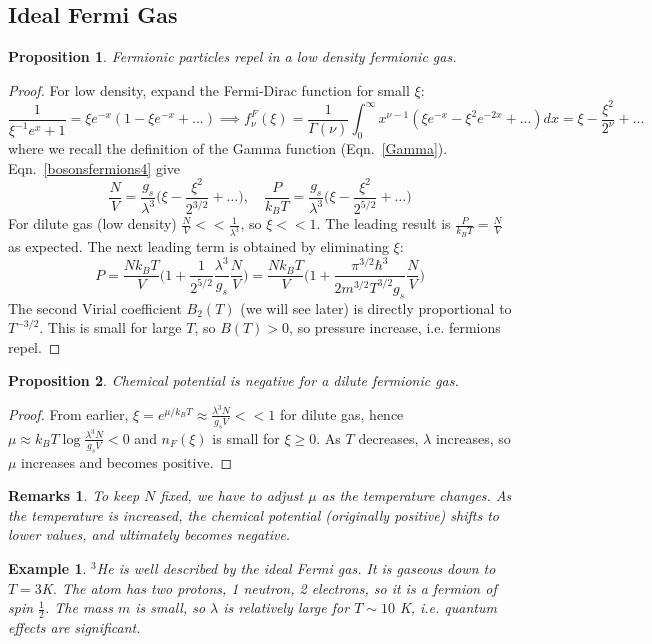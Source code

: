 \documentclass[a4paper]{article}
\newtheorem{eg}{Example}[section]
\newtheorem{remarks}{Remarks}[section]
\theoremstyle{new}
\newtheorem{prop}{Proposition}[section]
\begin{document}
\subsection{Ideal Fermi Gas}
\begin{prop}
Fermionic particles repel in a low density fermionic gas.
\end{prop}
\begin{proof}
For low density, expand the Fermi-Dirac function for small $\xi$:
$$\frac{1}{\xi^{-1}e^x+1}=\xi e^{-x}(1-\xi e^{-x}+...)\implies f_\nu^F(\xi)=\frac{1}{\Gamma(\nu)}\int_0^\infty x^{\nu-1}(\xi e^{-x}-\xi^2e^{-2x}+...)dx=\xi-\frac{\xi^2}{2^\nu}+...$$
where we recall the definition of the Gamma function (Eqn.~\ref{Gamma}). Eqn.~\ref{bosonsfermions4} give
$$\frac{N}{V}=\frac{g_s}{\lambda^3}\bigg(\xi-\frac{\xi^2}{2^{3/2}}+\dots\bigg),\quad\frac{P}{k_BT}=\frac{g_s}{\lambda^3}\bigg(\xi-\frac{\xi^2}{2^{5/2}}+\dots\bigg)$$
For dilute gas (low density) $\frac{N}{V}<<\frac{1}{\lambda^3}$, so $\xi<<1$. The leading result is $\frac{P}{k_BT}=\frac{N}{V}$ as expected. The next leading term is obtained by eliminating $\xi$:
$$P=\frac{Nk_BT}{V}\bigg(1+\frac{1}{2^{5/2}}\frac{\lambda^3}{g_s}\frac{N}{V}\bigg)=\frac{Nk_BT}{V}\bigg(1+\frac{\pi^{3/2}\hbar^3}{2m^{3/2}T^{3/2}g_s}\frac{N}{V}\bigg)$$
The second Virial coefficient $B_2(T)$ (we will see later) is directly proportional to $T^{-3/2}$. This is small for large $T$, so $B(T)>0$, so pressure increase, i.e. fermions repel.
\end{proof}
\begin{prop}
Chemical potential is negative for a dilute fermionic gas.
\end{prop}
\begin{proof}
From earlier, $\xi=e^{\mu/k_BT}\approx\frac{\lambda^3N}{g_sV}<<1$ for dilute gas, hence $\mu\approx k_BT\log\frac{\lambda^3N}{g_sV}<0$ and $n_F(\xi)$ is small for $\xi\geq0$. As $T$ decreases, $\lambda$ increases, so $\mu$ increases and becomes positive. 
\end{proof}
\begin{remarks}
To keep $N$ fixed, we have to adjust $\mu$ as the temperature changes. As the temperature is increased, the chemical potential (originally positive) shifts to lower values, and ultimately becomes negative.
\end{remarks}
\begin{eg}
$^3$He is well described by the ideal Fermi gas. It is gaseous down to $T=3$K. The atom has two protons, 1 neutron, 2 electrons, so it is a fermion of spin $\frac{1}{2}$. The mass $m$ is small, so $\lambda$ is relatively large for $T\sim 10$ K, i.e. quantum effects are significant.
\end{eg}
\end{document}
